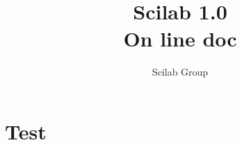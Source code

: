 
             \title{Scilab 1.0 \\ On line doc }
             \author{Scilab Group}
             \textheight=660pt 
             \textwidth=470pt
             \topmargin=-27pt 
             \oddsidemargin=0.7cm
             \evensidemargin=0.7cm
             \marginparwidth=60pt
\def\vector#1{\left( \begin{array}{c} #1  \end{array}\right)}
\def\matrixq#1{\left( \begin{array}{cc} #1  \end{array}\right)}

\makeindex 

\maketitle

\chapter{Test}
 
\printindex

